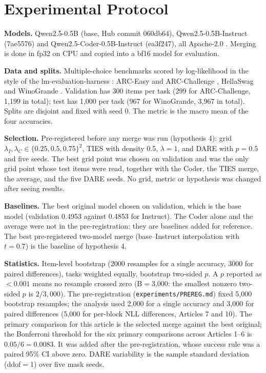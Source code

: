 \documentclass[conference]{IEEEtran}
\begin{document}
\section{Experimental Protocol}
\textbf{Models.} Qwen2.5-0.5B (base, Hub commit 060db64), Qwen2.5-0.5B-Instruct (7ae5576) and Qwen2.5-Coder-0.5B-Instruct (ea3f247), all Apache-2.0 \cite{yang2024qwen25,hui2024qwen25coder}. Merging is done in fp32 on CPU and copied into a bf16 model for evaluation.

\textbf{Data and splits.} Multiple-choice benchmarks scored by log-likelihood in the style of the lm-evaluation-harness \cite{gao2021harness}: ARC-Easy and ARC-Challenge \cite{clark2018arc}, HellaSwag \cite{zellers2019hellaswag} and WinoGrande \cite{sakaguchi2019winogrande}. Validation has 300 items per task (299 for ARC-Challenge, 1{,}199 in total); test has 1{,}000 per task (967 for WinoGrande, 3{,}967 in total). Splits are disjoint and fixed with seed 0. The metric is the macro mean of the four accuracies.

\textbf{Selection.} Pre-registered before any merge was run (hypothesis 4): grid $\lambda_I,\lambda_C\in\{0.25,0.5,0.75\}^2$, TIES with density 0.5, $\lambda=1$, and DARE with $p=0.5$ and five seeds. The best grid point was chosen on validation and was the only grid point whose test items were read, together with the Coder, the TIES merge, the average, and the five DARE seeds. No grid, metric or hypothesis was changed after seeing results.

\textbf{Baselines.} The best original model chosen on validation, which is the base model (validation 0.4953 against 0.4853 for Instruct). The Coder alone and the average were not in the pre-registration: they are baselines added for reference. The best pre-registered two-model merge (base--Instruct interpolation with $t=0.7$) is the baseline of hypothesis 4.

\textbf{Statistics.} Item-level bootstrap \cite{efron1979bootstrap,miller2024errorbars} (2000 resamples for a single accuracy, 3000 for paired differences), tasks weighted equally, bootstrap two-sided $p$. A $p$ reported as $<0.001$ means no resample crossed zero (B$=$3{,}000: the smallest nonzero two-sided $p$ is $2/3{,}000$). The pre-registration (\texttt{experiments/PREREG.md}) fixed 5{,}000 bootstrap resamples; the analysis used 2{,}000 for a single accuracy and 3{,}000 for paired differences (5{,}000 for per-block NLL differences, Articles 7 and 10). The primary comparison for this article is the selected merge against the best original; the Bonferroni threshold for the six primary comparisons across Articles 1--6 is $0.05/6=0.0083$. It was added after the pre-registration, whose success rule was a paired 95\% CI above zero. DARE variability is the sample standard deviation (ddof$=$1) over five mask seeds.
\end{document}
